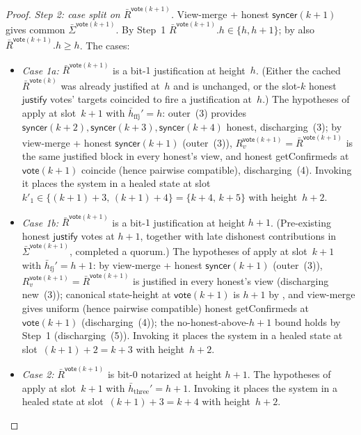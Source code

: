 \ifx\litemode\undefined\documentclass{article}\fi
\newcommand{\just}{\ensuremath{\mathsf{justify}}\xspace}
\newcommand{\syncer}{\mathsf{syncer}}
\newcommand{\vote}{\mathsf{vote}}
\newcommand{\comm}[1]{\bar{#1}}
\newcommand{\getConfirmed}{\textsf{getConfirmed}\xspace}
\theoremstyle{plain}
\theoremstyle{definition}
\theoremstyle{remark}
\begin{document}
\begin{proof}
\emph{Step 2: case split on $\comm{R}^{\vote(k+1)}$.}
View-merge + honest $\syncer(k+1)$ gives common $\comm{\Sigma}^{\vote(k+1)}$. By Step~1 $\comm{R}^{\vote(k+1)}.h \in \{h, h+1\}$; by  also $\comm{R}^{\vote(k+1)}.h \geq h$. The cases:
\begin{itemize}
  \item \emph{Case 1a:} $\comm{R}^{\vote(k+1)}$ is a bit-$1$ justification at height~$h$. (Either the cached $\comm{R}^{\vote(k)}$ was already justified at~$h$ and is unchanged, or the slot-$k$ honest \just votes' targets coincided to fire a justification at~$h$.) The hypotheses of  apply at slot~$k+1$ with $\comm{h}_{\text{ffj}}' = h$: outer~(3) provides $\syncer(k+2), \syncer(k+3), \syncer(k+4)$ honest, discharging~(3); by view-merge + honest $\syncer(k+1)$ (outer~(3)), $R_v^{\vote(k+1)} = \comm{R}^{\vote(k+1)}$ is the same justified block in every honest's view, and honest \getConfirmed{}s at $\vote(k+1)$ coincide (hence pairwise compatible), discharging~(4). Invoking it places the system in a healed state at slot~$k'_1 \in \{(k+1)+3,\, (k+1)+4\} = \{k+4,\, k+5\}$ with height~$h+2$.
  \item \emph{Case 1b:} $\comm{R}^{\vote(k+1)}$ is a bit-$1$ justification at height $h+1$. (Pre-existing honest \just votes at $h+1$, together with late dishonest contributions in $\comm{\Sigma}^{\vote(k+1)}$, completed a quorum.) The hypotheses of  apply at slot~$k+1$ with $\comm{h}_{\text{fj}}' = h+1$: by view-merge + honest $\syncer(k+1)$ (outer~(3)), $R_v^{\vote(k+1)} = \comm{R}^{\vote(k+1)}$ is justified in every honest's view (discharging new~(3)); canonical state-height at $\vote(k+1)$ is $h+1$ by , and view-merge gives uniform (hence pairwise compatible) honest \getConfirmed{}s at $\vote(k+1)$ (discharging~(4)); the no-honest-above-$h+1$ bound holds by Step~1 (discharging~(5)). Invoking it places the system in a healed state at slot~$(k+1)+2 = k+3$ with height~$h+2$.
  \item \emph{Case 2:} $\comm{R}^{\vote(k+1)}$ is bit-$0$ notarized at height $h+1$. The hypotheses of  apply at slot~$k+1$ with $\comm{h}_{\text{three}}' = h+1$. Invoking it places the system in a healed state at slot~$(k+1)+3 = k+4$ with height~$h+2$.

\end{itemize}
\end{proof}
\end{document}
